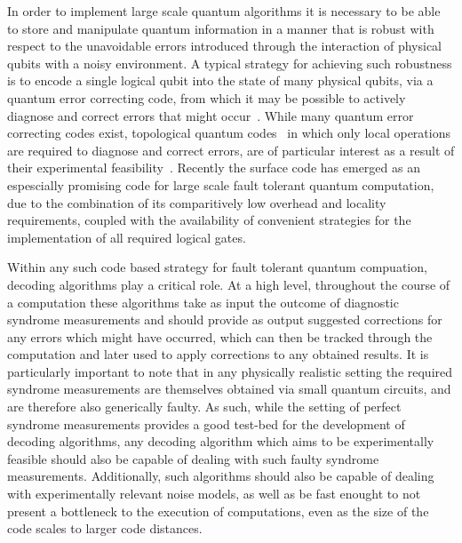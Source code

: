 \documentclass[twocolumn,preprintnumbers,amsmath,amssymb,notitlepage,nofootinbib,longbibliography,superscriptaddress,aps,pra,10pt]{revtex4-1}
\begin{document}
	In order to implement large scale quantum algorithms it is necessary to be able to store and manipulate quantum information in a manner that is robust with respect to the unavoidable errors introduced through the interaction of physical qubits with a noisy environment.
	A typical strategy for achieving such robustness is to encode a single logical qubit into the state of many physical qubits, via a quantum error correcting code, from which it may be possible to actively diagnose and correct errors that might occur~\cite{Terhal15,Campbell17}.
	While many quantum error correcting codes exist, topological quantum codes~\cite{Kitaev03, Dennis02, Preskill17lectures, Nayak08, Pachos12, Terhal15, Brown16, Campbell17} in which only local operations are required to diagnose and correct errors, are of particular interest as a result of their experimental feasibility~\cite{Reed12, Barends14, Nigg14, Corcoles15, Albrecht16, Takita16, Linke17}.
	Recently the surface code has emerged as an espescially promising code for large scale fault tolerant quantum computation, due to the combination of its comparitively low overhead and locality requirements, coupled with the availability of convenient strategies for the implementation of all required logical gates.

	Within any such code based strategy for fault tolerant quantum compuation, decoding algorithms play a critical role.
	At a high level, throughout the course of a computation these algorithms take as input the outcome of diagnostic syndrome measurements and should provide as output suggested corrections for any errors which might have occurred, which can then be tracked through the computation and later used to apply corrections to any obtained results.
	It is particularly important to note that in any physically realistic setting the required syndrome measurements are themselves obtained via small quantum circuits, and are therefore also generically faulty.
	As such, while the setting of perfect syndrome measurements provides a good test-bed for the development of decoding algorithms, any decoding algorithm which aims to be experimentally feasible should also be capable of dealing with such faulty syndrome measurements.
	Additionally, such algorithms should also be capable of dealing with experimentally relevant noise models, as well as be fast enought to not present a bottleneck to the execution of computations, even as the size of the code scales to larger code distances.
\end{document}
